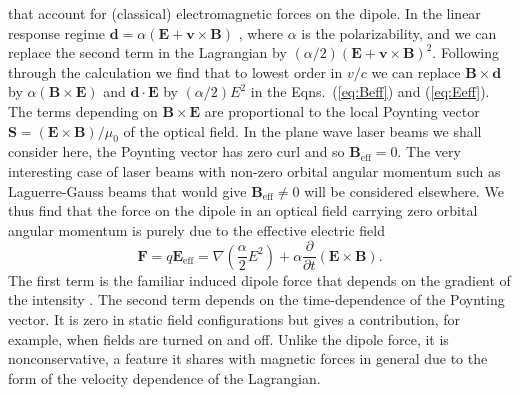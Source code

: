 \documentclass[twocolumn,english,pra,aps,superscriptaddress,floatfix]{revtex4-1}
\begin{document}
that account for (classical) electromagnetic forces on the dipole. In the linear response regime $\mathbf{d}=\alpha (\mathbf{E}+ \mathbf{v}\times \mathbf{B})$ \cite{wei95}, where $\alpha$ is the polarizability, and we can replace the second term in the Lagrangian by $(\alpha/2) (\mathbf{E}+ \mathbf{v}\times \mathbf{B})^2$. Following through the calculation we find that to lowest order in $v/c$ we can replace $\mathbf{B} \times \mathbf{d}$ by $\alpha (\mathbf{B} \times \mathbf{E})$ and $\mathbf{d} \cdot \mathbf{E}$ by $(\alpha/2) E^2$ in the Eqns.\ (\ref{eq:Beff}) and (\ref{eq:Eeff}). The terms depending on $\mathbf{B} \times \mathbf{E}$ are proportional to the local Poynting vector $\mathbf{S}=(\mathbf{E} \times \mathbf{B})/\mu_{0}$ of the optical field. In the plane wave laser beams we shall consider here, the Poynting vector has zero curl and so $\mathbf{B}_{\mathrm{eff}} =0$. The very interesting case of laser beams with non-zero orbital angular momentum such as Laguerre-Gauss beams that would give  $\mathbf{B}_{\mathrm{eff}} \neq 0$ will be considered elsewhere. We thus find that the force on the dipole in an optical field carrying zero orbital angular momentum is purely due to the effective electric field
\begin{equation}
\mathbf{F}=q \mathbf{E}_{\mathrm{eff}}= \nabla \left( \frac{\alpha}{2} E^2 \right)+\alpha \frac{\partial}{\partial t} (\mathbf{E} \times \mathbf{B}).
\end{equation}
The first term is the familiar induced dipole force that depends on the gradient of the intensity \cite{cohentannoudjibook}. The second term depends on the time-dependence of the Poynting vector. It is zero in static field configurations but gives a contribution, for example, when fields are turned on and off. Unlike the dipole force, it is nonconservative, a feature it shares with magnetic forces in general due to the form of the velocity dependence of the Lagrangian.



\end{document}
